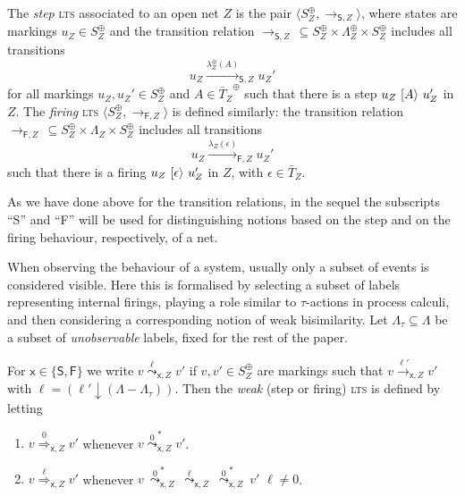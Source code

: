 \documentclass{LMCS}
\newcommand{\mon}[1]{\ensuremath{{#1}^\oplus}}
\newcommand{\monSub}[2]{\ensuremath{{#1}_{#2}^\oplus}}
\newcommand{\res}[2]{\ensuremath{({#1}\!\downarrow\!{#2})}}
\newcommand{\trans}[1]{\ensuremath{\ [\/{#1}\/\rangle}\ }
\newcommand{\ltr}[3][x]{\ensuremath{\stackrel{{#3}}{\longrightarrow}_{\mathsf{#1},#2}}}
\newcommand{\wltr}[3][x]{\ensuremath{\stackrel{{#3}}{\leadsto}_{\mathsf{#1},#2}}}
\newcommand{\wltrStar}[3][x]{\ensuremath{\stackrel{{#3}}{\leadsto}^*_{\mathsf{#1},#2}}}
\newcommand{\Ltr}[3][x]{\ensuremath{\stackrel{{#3}}{\Longrightarrow}_{\mathsf{#1},#2}}}
\begin{document}
\begin{defi}
  The \emph{step} \textsc{lts} associated to an open net $Z$ is the
  pair $\langle \monSub{S}{Z}, \to_{\mathsf{S},Z} \rangle$, where states are
  markings $u_Z \in \monSub{S}{Z}$ and the transition relation
  $\to_{\mathsf{S},Z}\, \subseteq \monSub{S}{Z} \times \monSub{\Lambda}{Z} \times
  \monSub{S}{Z}$ includes all transitions
  \[    
  u_Z  \ltr[S]{Z}{\monSub{\lambda}{Z}(A)} u_Z'
  \]
  for all markings $u_Z, u_Z' \in \monSub{S}{Z}$ and $A \in
  \mon{\bar{T}_Z}$ such that there is a step $u_Z \trans{A} u_Z'$ in
  $Z$.
The \emph{firing} \textsc{lts} $\langle \monSub{S}{Z},
  \to_{\mathsf{F},Z} \rangle$ is defined 
  similarly: the transition  relation
  $\to_{\mathsf{F},Z}\, \subseteq \monSub{S}{Z} \times \Lambda_Z \times
  \monSub{S}{Z}$ includes all transitions
  \[    
  u_Z  \ltr[F]{Z}{\lambda_Z(\epsilon)} u_Z'
  \]
  such that there is a firing $u_Z \trans{\epsilon} u_Z'$ in
  $Z$, with $\epsilon \in \bar{T}_Z$.
\end{defi}

As we have done above for the transition relations, in the sequel the
subscripts ``\textsf{S}'' and ``\textsf{F}'' will be used for distinguishing
notions based on the step and on the firing behaviour,
respectively, of a net.

When observing the behaviour of a system, usually only a subset of
events is considered visible.  Here this is formalised by selecting
a subset of labels representing internal firings, playing a role
similar to $\tau$-actions in process calculi, and then considering a
corresponding notion of weak bisimilarity.
Let $\Lambda_\tau \subseteq \Lambda$ be a subset of
\emph{unobservable} labels, fixed for the rest of the paper.

\begin{defi}
  For $\mathsf{x} \in \{ \mathsf{S}, \mathsf{F} \}$ we write $v
  \wltr{Z}{\ell} v'$ if $v, v' \in \monSub{S}{Z}$ are markings such
  that $v \ltr{Z}{\ell'} v'$ with $\ell =
  \res{\ell'}{(\Lambda-\Lambda_\tau)}$.
Then the \emph{weak} (step or firing) \textsc{lts} is defined by
  letting

  \begin{enumerate}[$\bullet$]
    
  \item $v \Ltr{Z}{0} v'$ whenever $v \wltrStar{Z}{0} v'$.
    


  \item $v \Ltr{Z}{\ell} v'$ whenever $v\
    \wltrStar{Z}{0}\ \wltr{Z}{\ell}\
    \wltrStar{Z}{0}\ v'$ \qquad $\ell \neq 0$.
    
  \end{enumerate}
\end{defi}
\end{document}

